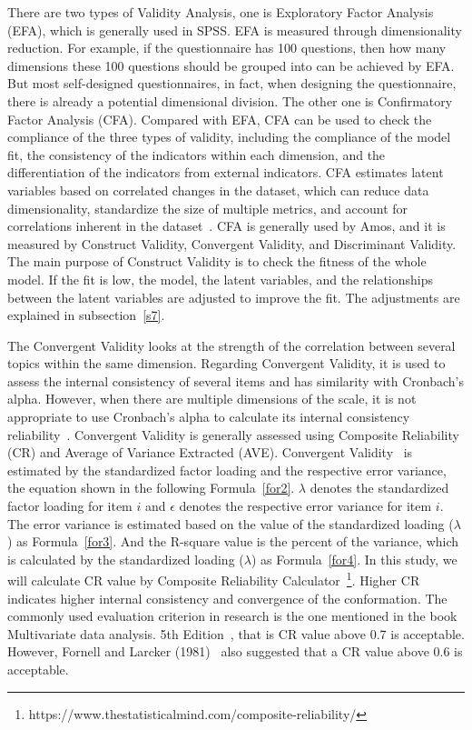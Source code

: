 There are two types of Validity Analysis, one is Exploratory Factor Analysis (EFA), which is generally used in SPSS. EFA is measured through dimensionality reduction. For example, if the questionnaire has 100 questions, then how many dimensions these 100 questions should be grouped into can be achieved by EFA. But most self-designed questionnaires, in fact, when designing the questionnaire, there is already a potential dimensional division. The other one is Confirmatory Factor Analysis (CFA). Compared with EFA, CFA can be used to check the compliance of the three types of validity, including the compliance of the model fit, the consistency of the indicators within each dimension, and the differentiation of the indicators from external indicators. CFA estimates latent variables based on correlated changes in the dataset, which can reduce data dimensionality, standardize the size of multiple metrics, and account for correlations inherent in the dataset~\cite{ref16}. CFA is generally used by Amos, and it is measured by Construct Validity, Convergent Validity, and Discriminant Validity. The main purpose of Construct Validity is to check the fitness of the whole model. If the fit is low, the model, the latent variables, and the relationships between the latent variables are adjusted to improve the fit. The adjustments are explained in subsection~\ref{s7}. 

The Convergent Validity looks at the strength of the correlation between several topics within the same dimension. 
Regarding Convergent Validity, it is used to assess the internal consistency of several items and has similarity with Cronbach's alpha. However, when there are multiple dimensions of the scale, it is not appropriate to use Cronbach's alpha to calculate its internal consistency reliability~\cite{ref29,ref30}. Convergent Validity is generally assessed using Composite Reliability (CR) and Average of Variance Extracted (AVE). Convergent Validity~\cite{ref33} is estimated by the standardized factor loading and the respective error variance, the equation shown in the following Formula~\ref{for2}. $\lambda$ denotes the standardized factor loading for item $i$ and $\epsilon$ denotes the respective error variance for item $i$. The error variance is estimated based on the value of the standardized loading ($\lambda$) as Formula~\ref{for3}. And the R-square value is the percent of the variance, which is calculated by the standardized loading ($\lambda$) as Formula~\ref{for4}. In this study, we will calculate CR value by Composite Reliability Calculator~\footnote{https://www.thestatisticalmind.com/composite-reliability/}. Higher CR indicates higher internal consistency and convergence of the conformation. The commonly used evaluation criterion in research is the one mentioned in the book Multivariate data analysis. 5th Edition~\cite{ref32}, that is CR value above 0.7 is acceptable. However, Fornell and Larcker (1981)~\cite{ref31} also suggested that a CR value above 0.6 is acceptable. 

